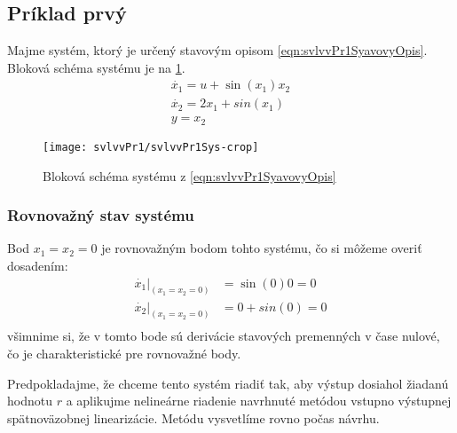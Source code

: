 \documentclass[../main.tex]{subfiles}
\begin{document}
    \subsection{Príklad prvý}
	    Majme systém, ktorý je určený stavovým opisom \cref{eqn:svlvvPr1SyavovyOpis}. Bloková schéma systému je na \cref{fig:svlvvPr1BlockSchemaSystemu}.
	\begin{equation}
		\begin{gathered}
		\dot{x_1}  =u + \sin(x_1) x_2 \\
		\dot{x_2} = 2x_1 + sin(x_1) \\
		y = x_2
		\end{gathered}
		\label{eqn:svlvvPr1SyavovyOpis}
	\end{equation}
	\begin{figure}[h!]
		\centering
		\texttt{[image: svlvvPr1/svlvvPr1Sys-crop]}
		\caption{Bloková schéma systému z \cref{eqn:svlvvPr1SyavovyOpis}}
		\label{fig:svlvvPr1BlockSchemaSystemu}
	\end{figure}
    \subsubsection*{Rovnovažný stav systému}
    Bod $x_1 = x_2 = 0$ je rovnovažným bodom tohto systému, čo si môžeme overiť dosadením:
	\begin{equation*}
	    \begin{aligned}
            \dot{x_1}|_{(x_1 = x_2 = 0)} &= \sin(0) 0 = 0 \\
            \dot{x_2}|_{(x_1 = x_2 = 0)}  &= 0 + sin(0) = 0 \\
	    \end{aligned}
	    \label{eqn:svlvvPr1OverenieRB}
	\end{equation*}
	všimnime si, že v tomto bode sú derivácie stavových premenných v čase nulové, čo je charakteristické pre rovnovažné body.
	
	Predpokladajme, že chceme tento systém riadiť tak, aby výstup dosiahol žiadanú hodnotu $r$ a aplikujme nelineárne riadenie navrhnuté metódou vstupno výstupnej spätnoväzobnej linearizácie. Metódu vysvetlíme rovno počas návrhu. 
	
\end{document}
